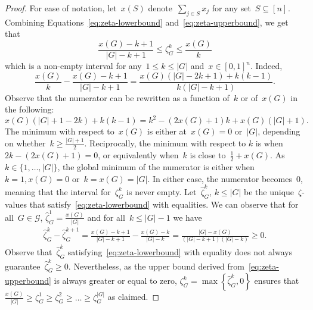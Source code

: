 \documentclass[a4paper,10pt]{article}
\newcommand{\brackets}[1]{\left\{ #1 \right\}}
\newcommand{\naturalsto}[2][]{\left[ #2 \right]_{#1}}
\theoremstyle{definition}
\begin{document}
\begin{proof}
  For ease of notation, let~$x(S)$ denote~$\sum_{j\in S} x_j$ for any set~$S\subseteq\naturalsto[]{n}$.
  Combining Equations~\eqref{eq:zeta-lowerbound} and~\eqref{eq:zeta-upperbound}, we get that
  \begin{equation*}
    \frac{x(G) -k + 1}{|G| - k + 1} \leq \zeta^k_G \leq \frac{x(G)}{k}
  \end{equation*}
  which is a non-empty interval for any~$1\leq k\leq |G|$ and~$x\in [0, 1]^n$.
  Indeed,
  \begin{equation*}
    \frac{x(G)}{k} - \frac{x(G) - k + 1}{|G|-k+1} = \frac{x(G)(|G| -2k+1) + k(k-1)}{k(|G|-k+1)}.
  \end{equation*}
  Observe that the numerator can be rewritten as a function of~$k$ or of~$x(G)$ in the following:
  \begin{equation*}
    x(G)\left(|G| + 1 - 2k\right) + k(k-1) = k^2 - (2x(G)+1)k + x(G)(|G|+1).
  \end{equation*}
  The minimum with respect to~$x(G)$ is either at~$x(G) = 0$ or~$|G|$, depending on whether~$k \geq \frac{|G|+1}{2}$. 
  Reciprocally, the minimum with respect to $k$ is when~$2k - (2x(G) + 1) = 0$, or equivalently when~$k$ is close to~$\frac{1}{2} + x(G)$.
  As~$k\in \{1, \dots, |G|\}$, the global minimum of the numerator is either when~$k = 1, x(G) = 0$ or~$k=x(G)=|G|$.
  In either case, the numerator becomes~$0$, meaning that the interval for~$\zeta^k_G$ is never empty.
  Let~$\hat{\zeta}^k_G$, $k\leq |G|$ be the unique~$\zeta$-values that satisfy~\eqref{eq:zeta-lowerbound} with equalities.
  We can observe that for all~$G\in\mathcal{G}$, $\hat{\zeta}^1_G = \frac{x(G)}{|G|}$ and for all~$k\leq|G|-1$ we have
  \begin{align*}
    \hat{\zeta}^k_G - \hat{\zeta}^{k+1}_G = \frac{x(G) - k + 1}{|G| - k + 1} - \frac{x(G) - k}{|G| - k} = \frac{|G| - x(G)}{(|G|-k+1)(|G|-k)} \geq 0.
  \end{align*}
  Observe that~$\hat{\zeta}^k_G$ satisfying~\eqref{eq:zeta-lowerbound} with equality does not always guarantee~$\hat{\zeta}^k_G \geq 0$.
  Nevertheless, as the upper bound derived from~\eqref{eq:zeta-upperbound} is always greater or equal to zero,  $\zeta^k_G = \max\brackets{\hat{\zeta}^k_G, 0}$ ensures that~$\frac{x(G)}{|G|} \geq \zeta^1_G \geq \zeta^2_G \geq \dots \geq \zeta^{|G|}_G$ as claimed.
\end{proof}
\end{document}
